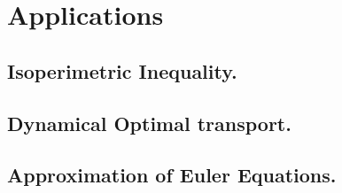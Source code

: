 \chapter{Applications}
\section{Isoperimetric Inequality.}
\section{Dynamical Optimal transport.}
\section{Approximation of Euler Equations.}


